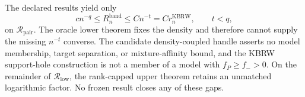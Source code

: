 The declared results yield only
\[
c n^{-q}\leq R_n^{\mathrm{band}}
\leq C n^{-t}=C r_n^{\mathrm{KBRW}},
\qquad t<q,
\]
on \(\mathcal R_{\mathrm{pair}}\).  The oracle lower theorem fixes the density
and therefore cannot supply the missing \(n^{-t}\) converse.  The candidate
density-coupled handle asserts no model membership, target separation, or
mixture-affinity bound, and the KBRW support-hole construction is not a member
of a model with \(f_P\geq f_->0\).  On the remainder of
\(\mathcal R_{\mathrm{low}}\), the rank-capped upper theorem retains an unmatched
logarithmic factor.  No frozen result closes any of these gaps.